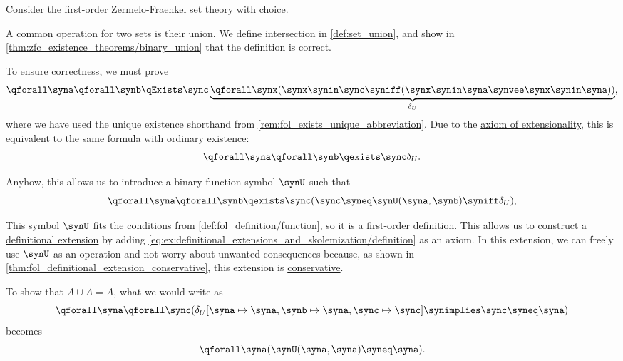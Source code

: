 \begin{remark}\label{rem:definitional_extensions_and_skolemization}
  Consider the first-order \hyperref[def:zfc]{Zermelo-Fraenkel set theory with choice}.

  A common operation for two sets is their union. We define intersection in \cref{def:set_union}, and show in \cref{thm:zfc_existence_theorems/binary_union} that the definition is correct.

  To ensure correctness, we must prove
  \begin{equation*}
    \qforall \syna \qforall \synb \qExists \sync \underbrace{\qforall \synx (\synx \synin \sync \syniff (\synx \synin \syna \synvee \synx \synin \syna))}_{\delta_U},
  \end{equation*}
  where we have used the unique existence shorthand from \cref{rem:fol_exists_unique_abbreviation}. Due to the \hyperref[def:axiomatic_set_theory/extensionality]{axiom of extensionality}, this is equivalent to the same formula with ordinary existence:
  \begin{equation*}
    \qforall \syna \qforall \synb \qexists \sync \delta_U.
  \end{equation*}

  Anyhow, this allows us to introduce a binary function symbol \( \synU \) such that
  \begin{equation}\label{eq:ex:definitional_extensions_and_skolemization/definition}
    \qforall \syna \qforall \synb \qexists \sync (\sync \syneq \synU(\syna, \synb) \syniff \delta_U),
  \end{equation}

  This symbol \( \synU \) fits the conditions from \cref{def:fol_definition/function}, so it is a first-order definition. This allows us to construct a \hyperref[def:fol_definitional_extension]{definitional extension} by adding \eqref{eq:ex:definitional_extensions_and_skolemization/definition} as an axiom. In this extension, we can freely use \( \synU \) as an operation and not worry about unwanted consequences because, as shown in \cref{thm:fol_definitional_extension_conservative}, this extension is \hyperref[def:fol_theory/conservative]{conservative}.

  To show that \( A \cup A = A \), what we would write as
  \begin{equation*}
    \qforall \syna \qforall \sync (\delta_U[\syna \mapsto \syna, \synb \mapsto \syna, \sync \mapsto \sync] \synimplies \sync \syneq \syna)
  \end{equation*}
  becomes
  \begin{equation*}
    \qforall \syna (\synU(\syna, \syna) \syneq \syna).
  \end{equation*}


\end{remark}
